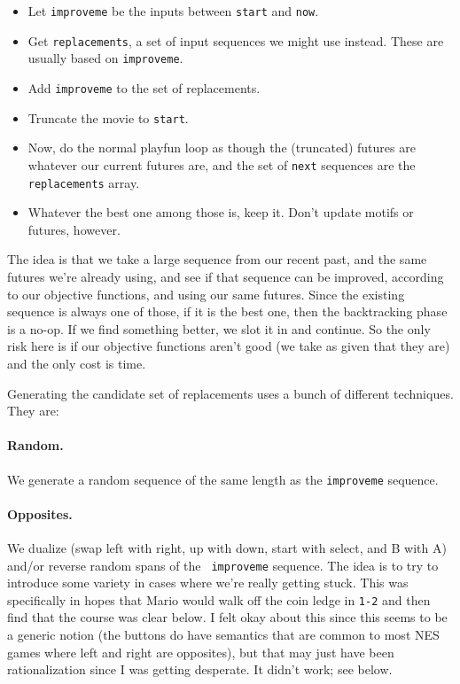 \documentclass[twocolumn]{article}
\begin{document}
\begin{itemize}
  \item Let {\tt improveme} be the inputs between {\tt start} and {\tt now}.
  \item Get {\tt replacements}, a set of input sequences we might use
    instead. These are usually based on {\tt improveme}.
  \item Add {\tt improveme} to the set of replacements.
  \item Truncate the movie to {\tt start}.
  \item Now, do the normal playfun loop as though the (truncated) futures
    are whatever our current futures are, and the set of {\tt next}
    sequences are the {\tt replacements} array.
  \item Whatever the best one among those is, keep it. Don't update motifs
    or futures, however.
\end{itemize}

The idea is that we take a large sequence from our recent past, and the
same futures we're already using, and see if that sequence can be improved,
according to our objective functions, and using our same futures. Since
the existing sequence is always one of those, if it is the best one,
then the backtracking phase is a no-op. If we find something better, we
slot it in and continue. So the only risk here is if our objective functions
aren't good (we take as given that they are) and the only cost is time.

Generating the candidate set of replacements uses a bunch of different
techniques. They are:

\paragraph{Random.} We generate a random sequence of the same length as
the {\tt improveme} sequence.

\paragraph{Opposites.} We dualize (swap left with right, up with down, start 
with select, and B with A) and/or reverse random spans of the {\tt
  improveme} sequence. The idea is to try to introduce some variety in
cases where we're really getting stuck. This was specifically in hopes
that Mario would walk off the coin ledge in {\tt 1-2} and then find that the
course was clear below. I felt okay about this since this seems to be a
generic notion (the buttons do have semantics that are common to most NES
games where left and right are opposites), but that may just have been
rationalization since I was getting desperate. It didn't work; see below.
\end{document}

